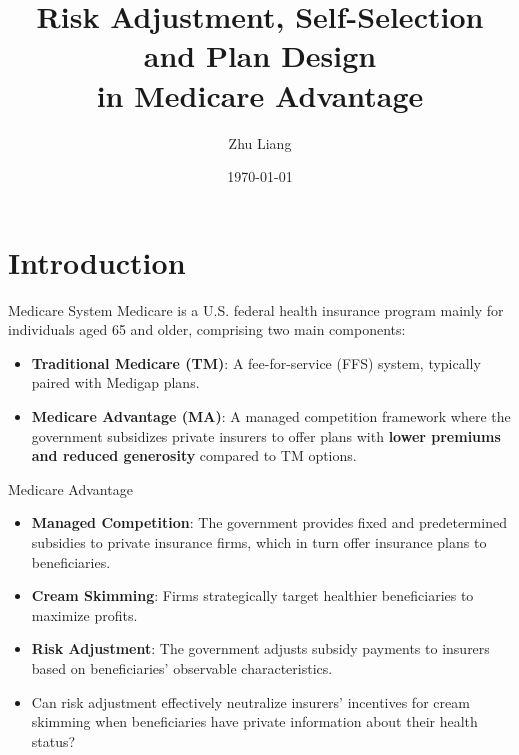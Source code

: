 \documentclass[professionalfonts, aspectratio=169]{beamer}
\title{Risk Adjustment, Self-Selection and Plan Design \\ in Medicare Advantage}
\institute{Stony Brook University}
\author{Zhu Liang}
\date{\today}
\begin{document}

\begin{frame} %
    \titlepage
\end{frame}

\section{Introduction}

\begin{frame}{Medicare System}
  Medicare is a U.S. federal health insurance program mainly for individuals aged 65 and older, comprising two main components:
  \begin{itemize}
    \item \textbf{Traditional Medicare (TM)}: A fee-for-service (FFS) system, typically paired with Medigap plans.
    \item \textbf{Medicare Advantage (MA)}: A managed competition framework where the government subsidizes private insurers to offer plans with \textbf{lower premiums and reduced generosity} compared to TM options.
  \end{itemize}
\end{frame}

\begin{frame}{Medicare Advantage}
  \begin{itemize}
    \item \textbf{Managed Competition}: The government provides fixed and predetermined subsidies to private insurance firms, which in turn offer insurance plans to beneficiaries.
    \item \textbf{Cream Skimming}: Firms strategically target healthier beneficiaries to maximize profits.
    \item \textbf{Risk Adjustment}: The government adjusts subsidy payments to insurers based on beneficiaries' observable characteristics.
    \item Can risk adjustment effectively neutralize insurers' incentives for cream skimming when beneficiaries have private information about their health status?
  \end{itemize}
\end{frame}
\end{document}
